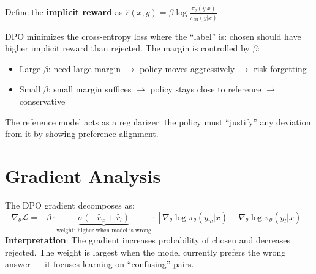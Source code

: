 \begin{intuitionbox}
Define the \textbf{implicit reward} as $\hat{r}(x,y) = \beta\log\frac{\pi_\theta(y|x)}{\pi_\text{ref}(y|x)}$.

DPO minimizes the cross-entropy loss where the ``label'' is: chosen should have higher implicit reward than rejected. The margin is controlled by $\beta$:

\begin{itemize}
  \item Large $\beta$: need large margin $\rightarrow$ policy moves aggressively $\rightarrow$ risk forgetting
  \item Small $\beta$: small margin suffices $\rightarrow$ policy stays close to reference $\rightarrow$ conservative
\end{itemize}

The reference model acts as a regularizer: the policy must ``justify'' any deviation from it by showing preference alignment.
\end{intuitionbox}

\section{Gradient Analysis}
\label{gradient-analysis}

The DPO gradient decomposes as: 
\begin{equation}
\nabla_\theta \mathcal{L} = -\beta \cdot \underbrace{\sigma(-\hat{r}_w + \hat{r}_l)}_{\text{weight: higher when model is wrong}} \cdot \left[\nabla_\theta \log\pi_\theta(y_w|x) - \nabla_\theta \log\pi_\theta(y_l|x)\right]
\end{equation}
 \textbf{Interpretation}: The gradient increases probability of chosen and decreases rejected. The weight is largest when the model currently prefers the wrong answer --- it focuses learning on ``confusing'' pairs.

